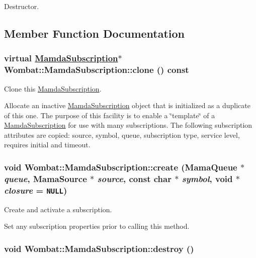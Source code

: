 Destructor. 



\subsection{Member Function Documentation}
\hypertarget{classWombat_1_1MamdaSubscription_7503a8caad225a4e727bb8ec49cf06a5}{
\subsubsection[clone]{\setlength{\rightskip}{0pt plus 5cm}virtual \hyperlink{classWombat_1_1MamdaSubscription}{Mamda\-Subscription}$\ast$ Wombat::Mamda\-Subscription::clone () const}}
\label{classWombat_1_1MamdaSubscription_7503a8caad225a4e727bb8ec49cf06a5}


Clone this \hyperlink{classWombat_1_1MamdaSubscription}{Mamda\-Subscription}. 

Allocate an inactive \hyperlink{classWombat_1_1MamdaSubscription}{Mamda\-Subscription} object that is initialized as a duplicate of this one. The purpose of this facility is to enable a \char`\"{}template\char`\"{} of a \hyperlink{classWombat_1_1MamdaSubscription}{Mamda\-Subscription} for use with many subscriptions. The following subscription attributes are copied: source, symbol, queue, subscription type, service level, requires initial and timeout. \hypertarget{classWombat_1_1MamdaSubscription_f73189395471119f1cffa620d9ad824e}{
\subsubsection[create]{\setlength{\rightskip}{0pt plus 5cm}void Wombat::Mamda\-Subscription::create (Mama\-Queue $\ast$ {\em queue}, Mama\-Source $\ast$ {\em source}, const char $\ast$ {\em symbol}, void $\ast$ {\em closure} = {\tt NULL})}}
\label{classWombat_1_1MamdaSubscription_f73189395471119f1cffa620d9ad824e}


Create and activate a subscription. 

Set any subscription properties prior to calling this method. \hypertarget{classWombat_1_1MamdaSubscription_ac174832862f54a4efe387dabf0766cb}{
\subsubsection[destroy]{\setlength{\rightskip}{0pt plus 5cm}void Wombat::Mamda\-Subscription::destroy ()}}
\label{classWombat_1_1MamdaSubscription_ac174832862f54a4efe387dabf0766cb}


